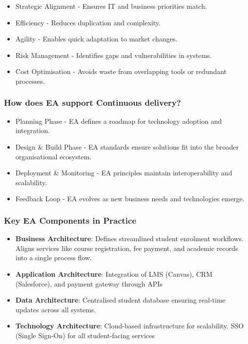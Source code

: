 \begin{itemize}
    \item Strategic Alignment - Ensures IT and business priorities match.
    \item Efficiency - Reduces duplication and complexity.
    \item Agility - Enables quick adaptation to market changes.
    \item Risk Management - Identifies gaps and vulnerabilities in systems.
    \item Cost Optimisation - Avoids waste from overlapping tools or redundant processes.
\end{itemize}

\subsubsection{How does EA support Continuous delivery?}

\begin{itemize}
    \item Planning Phase - EA defines a roadmap for technology adoption and integration.
    \item Design \& Build Phase - EA standards ensure solutions fit into the broader organisational ecosystem.
    \item Deployment \& Monitoring - EA principles maintain interoperability and scalability.
    \item Feedback Loop - EA evolves as new business needs and technologies emerge.
\end{itemize}

\subsubsection{Key EA Components in Practice}

\begin{itemize}
    \item \textbf{Business Architecture}: Defines streamlined student enrolment workflows. Aligns services like course registration, fee payment, and academic records into a single process flow.
    \item \textbf{Application Architecture}: Integration of LMS (Canvas), CRM (Salesforce), and payment gateway through APIs
    \item \textbf{Data Architecture}: Centralised student database ensuring real-time updates across all systems.
    \item \textbf{Technology Architecture}: Cloud-based infrastructure for scalability. SSO (Single Sign-On) for all student-facing services
\end{itemize}

